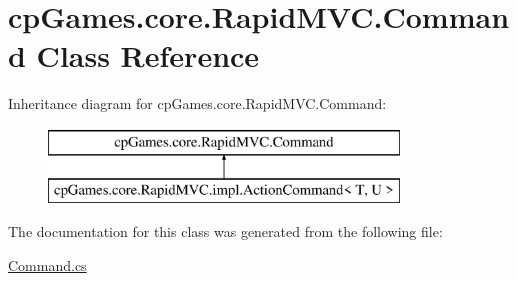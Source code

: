 \hypertarget{classcp_games_1_1core_1_1_rapid_m_v_c_1_1_command}{}\section{cp\+Games.\+core.\+Rapid\+M\+V\+C.\+Command Class Reference}
\label{classcp_games_1_1core_1_1_rapid_m_v_c_1_1_command}
Inheritance diagram for cp\+Games.\+core.\+Rapid\+M\+V\+C.\+Command\+:\begin{figure}[H]
\begin{center}
\leavevmode
\includegraphics[height=2.000000cm]{classcp_games_1_1core_1_1_rapid_m_v_c_1_1_command}
\end{center}
\end{figure}


The documentation for this class was generated from the following file\+:\begin{DoxyCompactItemize}
\item 
\mbox{\hyperlink{_command_8cs}{Command.\+cs}}\end{DoxyCompactItemize}
